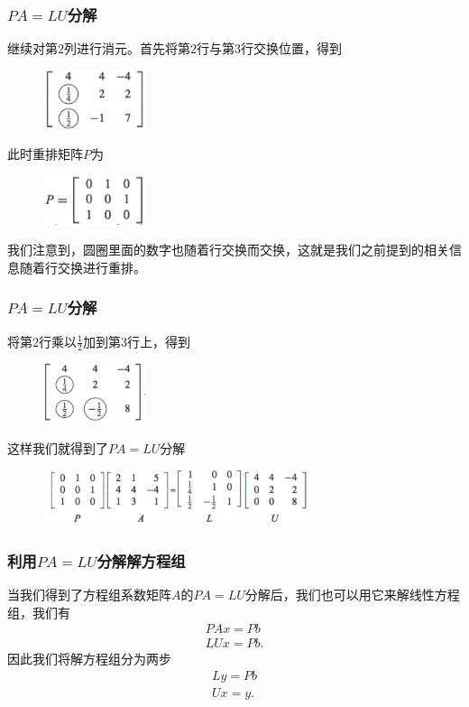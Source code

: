 \documentclass[10pt]{beamer}
\begin{document}
\begin{frame}
\frametitle{$PA = LU$分解}
继续对第$2$列进行消元。首先将第$2$行与第$3$行交换位置，得到
\begin{figure}
\includegraphics[width=3cm]{figs/2_4_PA-6} 
\end{figure}
此时重排矩阵$P$为
\begin{figure}
\includegraphics[width=3cm]{figs/2_4_PA-7} 
\end{figure}
我们注意到，圆圈里面的数字也随着行交换而交换，这就是我们之前提到的相关信息随着行交换进行重排。
\end{frame}


\begin{frame}
\frametitle{$PA = LU$分解}
将第$2$行乘以$\frac{1}{2}$加到第$3$行上，得到
\begin{figure}
\includegraphics[width=3cm]{figs/2_4_PA-8} 
\end{figure}
这样我们就得到了$PA = LU$分解
\begin{figure}
\includegraphics[width=8cm]{figs/2_4_PA-9} 
\end{figure}
\end{frame}


\begin{frame}
\frametitle{利用$PA = LU$分解解方程组}
当我们得到了方程组系数矩阵$A$的$PA = LU$分解后，我们也可以用它来解线性方程组，我们有
\begin{align}
PA x = Pb \nonumber \\
LU x = Pb.
\end{align}
因此我们将解方程组分为两步
\begin{align}
L y = Pb \nonumber \\
U x = y.
\end{align}
\end{frame}
\end{document}
